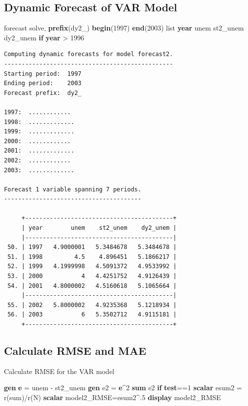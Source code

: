\documentclass[
]{book}
\newenvironment{Shaded}{\begin{snugshade}}{\end{snugshade}}
\newcommand{\FunctionTok}[1]{\textcolor[rgb]{0.13,0.29,0.53}{\textbf{#1}}}
\newcommand{\KeywordTok}[1]{\textcolor[rgb]{0.13,0.29,0.53}{\textbf{#1}}}
\newcommand{\NormalTok}[1]{#1}
\newcommand{\OtherTok}[1]{\textcolor[rgb]{0.56,0.35,0.01}{#1}}
\begin{document}
\subsection*{Dynamic Forecast of VAR Model}\label{dynamic-forecast-of-var-model}

\begin{Shaded}
\begin{Highlighting}[]
\NormalTok{forecast solve, }\KeywordTok{prefix}\NormalTok{(dy2\_) }\KeywordTok{begin}\NormalTok{(1997) }\KeywordTok{end}\NormalTok{(2003) }
\OtherTok{list} \FunctionTok{year}\NormalTok{ unem st2\_unem dy2\_unem }\KeywordTok{if} \FunctionTok{year}\NormalTok{ \textgreater{} 1996}
\end{Highlighting}
\end{Shaded}

\begin{verbatim}
Computing dynamic forecasts for model forecast2.
------------------------------------------------
Starting period:  1997
Ending period:    2003
Forecast prefix:  dy2_

1997:  ............
1998:  .............
1999:  .............
2000:  ............
2001:  .............
2002:  ............
2003:  .............

Forecast 1 variable spanning 7 periods.
---------------------------------------

     +------------------------------------------+
     | year        unem    st2_unem    dy2_unem |
     |------------------------------------------|
 50. | 1997   4.9000001   5.3484678   5.3484678 |
 51. | 1998         4.5    4.896451   5.1866217 |
 52. | 1999   4.1999998   4.5091372   4.9533992 |
 53. | 2000           4   4.4251752   4.9126439 |
 54. | 2001   4.8000002   4.5160618   5.1065664 |
     |------------------------------------------|
 55. | 2002   5.8000002   4.9235368   5.1218934 |
 56. | 2003           6   5.3502712   4.9115181 |
     +------------------------------------------+
\end{verbatim}

\subsection{Calculate RMSE and MAE}\label{calculate-rmse-and-mae}

Calculate RMSE for the VAR model

\begin{Shaded}
\begin{Highlighting}[]
\KeywordTok{gen} \FunctionTok{e}\NormalTok{ = unem {-} st2\_unem}
\KeywordTok{gen}\NormalTok{ e2 = }\FunctionTok{e}\NormalTok{\^{}2}
\KeywordTok{sum}\NormalTok{ e2 }\KeywordTok{if} \KeywordTok{test}\NormalTok{==1}
\FunctionTok{scalar}\NormalTok{ esum2 = }\OtherTok{\textasciigrave{}r(sum)\textquotesingle{}}\NormalTok{/}\OtherTok{\textasciigrave{}r(N)\textquotesingle{}}
\FunctionTok{scalar}\NormalTok{ model2\_RMSE=esum2\^{}.5}
\KeywordTok{display}\NormalTok{ model2\_RMSE}
\end{Highlighting}
\end{Shaded}
\end{document}

